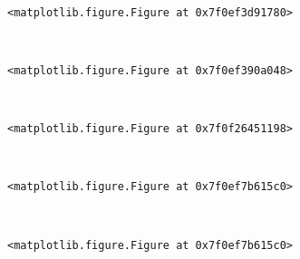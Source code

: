 \documentclass[11pt]{article}
\begin{document}
    
    \begin{center}
    \end{center}
    { \hspace*{\fill} \\}
    
    
    \begin{verbatim}
<matplotlib.figure.Figure at 0x7f0ef3d91780>
    \end{verbatim}

    
    \begin{center}
    \end{center}
    { \hspace*{\fill} \\}
    
    
    \begin{verbatim}
<matplotlib.figure.Figure at 0x7f0ef390a048>
    \end{verbatim}

    
    \begin{center}
    \end{center}
    { \hspace*{\fill} \\}
    
    
    \begin{verbatim}
<matplotlib.figure.Figure at 0x7f0f26451198>
    \end{verbatim}

    
    \begin{center}
    \end{center}
    { \hspace*{\fill} \\}
    
    
    \begin{verbatim}
<matplotlib.figure.Figure at 0x7f0ef7b615c0>
    \end{verbatim}

    
    \begin{center}
    \end{center}
    { \hspace*{\fill} \\}
    
    
    \begin{verbatim}
<matplotlib.figure.Figure at 0x7f0ef7b615c0>
    \end{verbatim}
\end{document}
